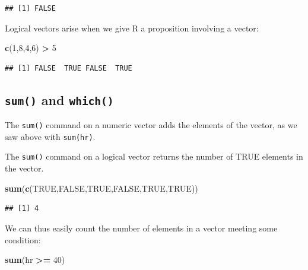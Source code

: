 \documentclass[
]{book}
\newenvironment{Shaded}{\begin{snugshade}}{\end{snugshade}}
\newcommand{\ConstantTok}[1]{\textcolor[rgb]{0.56,0.35,0.01}{#1}}
\newcommand{\DecValTok}[1]{\textcolor[rgb]{0.00,0.00,0.81}{#1}}
\newcommand{\FunctionTok}[1]{\textcolor[rgb]{0.13,0.29,0.53}{\textbf{#1}}}
\newcommand{\NormalTok}[1]{#1}
\newcommand{\SpecialCharTok}[1]{\textcolor[rgb]{0.81,0.36,0.00}{\textbf{#1}}}
\theoremstyle{definition}
\theoremstyle{definition}
\theoremstyle{definition}
\theoremstyle{definition}
\theoremstyle{remark}
\begin{document}
\begin{verbatim}
## [1] FALSE
\end{verbatim}

Logical vectors arise when we give R a proposition involving a vector:

\begin{Shaded}
\begin{Highlighting}[]
\FunctionTok{c}\NormalTok{(}\DecValTok{1}\NormalTok{,}\DecValTok{8}\NormalTok{,}\DecValTok{4}\NormalTok{,}\DecValTok{6}\NormalTok{) }\SpecialCharTok{\textgreater{}} \DecValTok{5}
\end{Highlighting}
\end{Shaded}

\begin{verbatim}
## [1] FALSE  TRUE FALSE  TRUE
\end{verbatim}

\subsection{\texorpdfstring{\texttt{sum()} and \texttt{which()}}{sum() and which()}}\label{sum-and-which}

The \texttt{sum()} command on a numeric vector adds the elements of the vector, as we saw above with \texttt{sum(hr)}.

The \texttt{sum()} command on a logical vector returns the number of TRUE elements in the vector.

\begin{Shaded}
\begin{Highlighting}[]
\FunctionTok{sum}\NormalTok{(}\FunctionTok{c}\NormalTok{(}\ConstantTok{TRUE}\NormalTok{,}\ConstantTok{FALSE}\NormalTok{,}\ConstantTok{TRUE}\NormalTok{,}\ConstantTok{FALSE}\NormalTok{,}\ConstantTok{TRUE}\NormalTok{,}\ConstantTok{TRUE}\NormalTok{))}
\end{Highlighting}
\end{Shaded}

\begin{verbatim}
## [1] 4
\end{verbatim}

We can thus easily count the number of elements in a vector meeting some condition:

\begin{Shaded}
\begin{Highlighting}[]
\FunctionTok{sum}\NormalTok{(hr }\SpecialCharTok{\textgreater{}=} \DecValTok{40}\NormalTok{)}
\end{Highlighting}
\end{Shaded}
\end{document}

